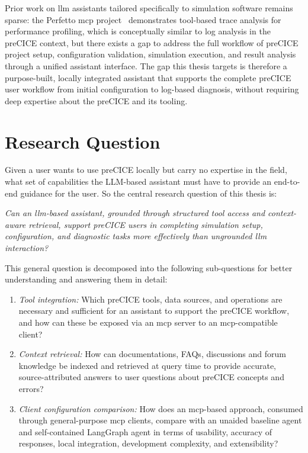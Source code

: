 \documentclass[
  numbers=noenddot,
  english,
  a4paper,
  twoside,
  bibliography=totoc,
  headsepline,
  cleardoublepage=empty,
  parskip=half,
  draft=false
]{scrbook}
\theoremstyle{break}
\renewcommand{\_}{\textunderscore\allowbreak}
\begin{document}
Prior work on \gls{llm} assistants tailored specifically to simulation software remains sparse:
the Perfetto \gls{mcp} project~\cite{perfettomcp2024} demonstrates tool-based trace analysis
for performance profiling, which is conceptually similar to log analysis in the preCICE context,
but there exists a gap to address the full workflow of preCICE project setup, configuration
validation, simulation execution, and result analysis through a unified assistant interface.
The gap this thesis targets is therefore a purpose-built, locally integrated assistant that
supports the complete preCICE user workflow from initial configuration to log-based diagnosis,
without requiring deep expertise about the preCICE and its tooling.


\section{Research Question}\label{sec:introduction:research-question}

Given a user wants to use preCICE locally but carry no expertise in the field, what set of 
capabilities the LLM-based assistant must have to provide an end-to-end guidance for the user. 
So the central research question of this thesis is:

\begin{center}
\emph{Can an \gls{llm}-based assistant, grounded through structured tool access and
context-aware retrieval, support preCICE users in completing simulation setup, configuration,
and diagnostic tasks more effectively than ungrounded \gls{llm} interaction?}
\end{center}

This general question is decomposed into the following sub-questions for better understanding and answering them in detail:

\begin{enumerate}[label=\textbf{RQ}\arabic*]
  \item \emph{Tool integration:} Which preCICE tools, data sources, and operations are
        necessary and sufficient for an assistant to support the preCICE workflow, and how
        can these be exposed via an \gls{mcp} server to an \gls{mcp}-compatible client?
  \item \emph{Context retrieval:} How can documentations, FAQs, discussions and forum knowledge be
        indexed and retrieved at query time to provide accurate, source-attributed answers to
        user questions about preCICE concepts and errors?
  \item \emph{Client configuration comparison:} How does an \gls{mcp}-based approach, consumed
        through general-purpose \gls{mcp} clients, compare with an unaided baseline agent and self-contained LangGraph
        agent in terms of usability, accuracy of responses, local integration, development
        complexity, and extensibility?
\end{enumerate}
\end{document}
